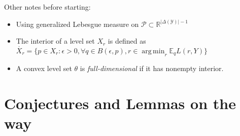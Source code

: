 \documentclass[12pt]{article}
\newcommand{\Comments}{1}
\newcommand{\mytodo}[2]{\ifnum\Comments=1%
  \todo[linecolor=#1!80!black,backgroundcolor=#1,bordercolor=#1!80!black]{#2}\fi}
\newcommand{\raft}[1]{\mytodo{green!20!white}{RF: #1}}
\newcommand{\jessiet}[1]{\mytodo{purple!20!white}{JF: #1}}
\newcommand{\reals}{\mathbb{R}}
\newcommand{\E}{\mathbb{E}}
\renewcommand{\P}{\mathcal{P}}
\newcommand{\Y}{\mathcal{Y}}
\newcommand{\inter}[1]{\mathring{#1}}%
\newcommand{\aff}{\text{aff}}
\DeclareMathOperator*{\argmin}{arg\,min}
\begin{document}
Other notes before starting:
\begin{itemize}
\item Using generalized Lebesgue measure on $\P \subset \reals^{|\Delta(\Y)|-1}$
\item The interior of a level set $X_r$ is defined as $\inter{X_r} = \{p \in X_r: \epsilon > 0,  \forall q \in B(\epsilon,p), r \in \argmin_r \E_q L(r,Y)\}$
\item A convex level set $\theta$ is \emph{full-dimensional} if it has nonempty interior. %
\end{itemize}

\section{Conjectures and Lemmas on the way}
\end{document}
